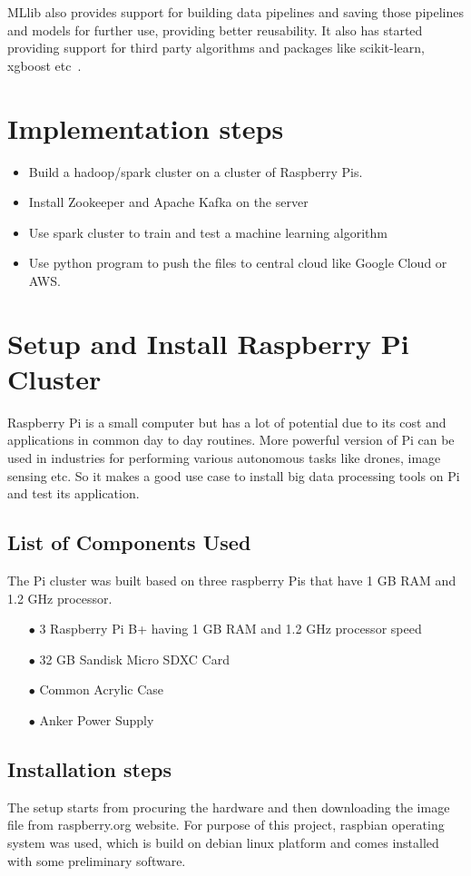MLlib also provides support for building data pipelines and saving those pipelines and models for further use, providing better reusability. It also has started providing support for third party algorithms and packages like scikit-learn, xgboost etc~\cite{hid-sp18-510-mllib2}.
\section{Implementation steps}
\begin{itemize}
	\item Build a hadoop/spark cluster on a cluster of Raspberry Pis.
	\item Install Zookeeper and Apache Kafka on the server
	\item Use spark cluster to train and test a machine learning algorithm
	\item Use python program to push the files to central cloud like Google Cloud or AWS.
\end{itemize} 

\section{Setup and Install Raspberry Pi Cluster}
Raspberry Pi is a small computer but has a lot of potential due to its cost and applications in common day to day routines. More powerful version of Pi can be used in industries for performing various autonomous tasks like drones, image sensing etc. So it makes a good use case to install big data processing tools on Pi and test its application.

\subsection{List of Components Used}
The Pi cluster was built based on three raspberry Pis that have 1 GB RAM and 1.2 GHz processor.
\begin{itemize}
	\item[$\bullet$] 3 Raspberry Pi B+ having 1 GB RAM and 1.2 GHz processor speed
	\item[$\bullet$] 32 GB Sandisk Micro SDXC Card
	\item[$\bullet$] Common Acrylic Case
	\item[$\bullet$] Anker Power Supply
\end{itemize}

\subsection{Installation steps}
The setup starts from procuring the hardware and then downloading the image file from raspberry.org website. For purpose of this project, raspbian operating system was used, which is build on debian linux platform and comes installed with some preliminary software.

